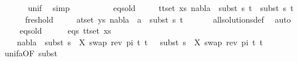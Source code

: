 \begin{isabellebody}
\ \ \ \ \ \isamarkupfalse%
\ unif{\isacharunderscore}{\kern0pt}{}\ \isamarkupfalse%
\ simp\isanewline
\isanewline
\ \ \ \isamarkupfalse%
\ {}\isanewline
\ \ \ \isamarkupfalse%
\ eqs{\isacharunderscore}{\kern0pt}old{\isacharcolon}{\kern0pt}\isanewline
\ \ \ \ \ {\isachardoublequoteopen}{\isasymforall}{\isacharparenleft}{\kern0pt}t{}{\isacharcomma}{\kern0pt}t{}{\isacharparenright}{\kern0pt}{\isasymin}set\ xs{\isachardot}{\kern0pt}\ nabla{}\ {\isasymturnstile}\ subst\ s{}\ t{}\ {\isasymapprox}\ subst\ s{}\ t{}{\isachardoublequoteclose}\isanewline
\ \ \ \ \ \ fresh{\isacharunderscore}{\kern0pt}old{\isacharcolon}{\kern0pt}\isanewline
\ \ \ \ \ {\isachardoublequoteopen}{\isasymforall}{\isacharparenleft}{\kern0pt}a{\isacharcomma}{\kern0pt}t{\isacharparenright}{\kern0pt}{\isasymin}set\ ys{\isachardot}{\kern0pt}\ nabla{}\ {\isasymturnstile}\ a\ {\isasymsharp}\ subst\ s{}\ t{\isachardoublequoteclose}\isanewline
\ \ \ \ \ \isamarkupfalse%
\ all{\isacharunderscore}{\kern0pt}solutions{\isacharunderscore}{\kern0pt}def\ \isamarkupfalse%
\ auto\isanewline
\isanewline
\ \ \ \isamarkupfalse%
\ eqs{\isacharunderscore}{\kern0pt}old\ \isanewline
\ \ \ \isamarkupfalse%
\ eqs{\isacharcolon}{\kern0pt}\ {\isachardoublequoteopen}{\isasymforall}{\isacharparenleft}{\kern0pt}t{}{\isacharcomma}{\kern0pt}t{}{\isacharparenright}{\kern0pt}{\isasymin}set\ xs{\isachardot}{\kern0pt}\ \isanewline
\ \ \ \ nabla{}\ {\isasymturnstile}\ subst\ {\isacharparenleft}{\kern0pt}s{}\ {\isasymbullet}\ {\isacharbrackleft}{\kern0pt}{\isacharparenleft}{\kern0pt}X{\isacharcomma}{\kern0pt}\ swap\ {\isacharparenleft}{\kern0pt}rev\ pi{\isacharparenright}{\kern0pt}\ t{\isacharprime}{\kern0pt}{\isacharparenright}{\kern0pt}{\isacharbrackright}{\kern0pt}{\isacharparenright}{\kern0pt}\ t{}\ {\isasymapprox}\ \ subst\ {\isacharparenleft}{\kern0pt}s{}\ {\isasymbullet}\ {\isacharbrackleft}{\kern0pt}{\isacharparenleft}{\kern0pt}X{\isacharcomma}{\kern0pt}\ swap\ {\isacharparenleft}{\kern0pt}rev\ pi{\isacharparenright}{\kern0pt}\ t{\isacharprime}{\kern0pt}{\isacharparenright}{\kern0pt}{\isacharbrackright}{\kern0pt}{\isacharparenright}{\kern0pt}\ t{}{\isachardoublequoteclose}\isanewline
\ \ \ \ \ \isamarkupfalse%
\ unif{\isacharunderscore}{\kern0pt}{}a{\isacharbrackleft}{\kern0pt}OF\ subst{\isacharbrackright}{\kern0pt}\ \isamarkupfalse%

\end{isabellebody}
